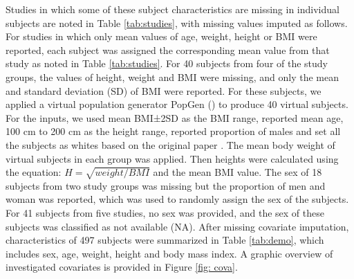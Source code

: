 \documentclass[utf8]{frontiersSCNS} %
\begin{document}
Studies in which some of these subject characteristics are missing in individual subjects are noted in Table \ref{tab:studies}, with missing values imputed as follows. For studies in which only mean values of age, weight, height or BMI were reported, each subject was assigned the corresponding mean value from that study as noted in Table \ref{tab:studies}. For 40 subjects from four of the study groups, the values of height, weight and BMI were missing, and only the mean and standard deviation (SD) of BMI were reported. For these subjects, we applied a virtual population generator PopGen (\cite{McNally2015}) to produce 40 virtual subjects. For the inputs, we used mean BMI±2SD as the BMI range, reported mean age, 100 cm to 200 cm as the height range, reported proportion of males and set all the subjects as whites based on the original paper \citep{1998_AGING_Ahren}. The mean body weight of virtual subjects in each group was applied. Then heights were calculated using the equation: $H=\sqrt{weight/BMI}$ and the mean BMI value. The sex of 18 subjects from two study groups was missing but the proportion of men and woman was reported, which was used to randomly assign the sex of the subjects. For 41 subjects from five studies, no sex was provided, and the sex of these subjects was classified as not available (NA). After missing covariate imputation, characteristics of 497 subjects were summarized in Table \ref{tab:demo}, which includes sex, age, weight, height and body mass index. A graphic overview of investigated covariates is provided in Figure \ref{fig: cova}. 
\end{document}
